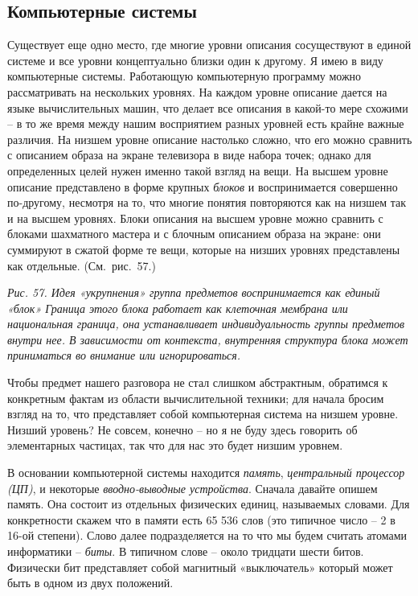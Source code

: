 \documentclass[../main.tex]{subfiles}
\begin{document}
\subsection{Компьютерные системы}

Существует еще одно место, где многие уровни описания сосуществуют в единой системе и все уровни концептуально близки один к другому. Я имею в виду компьютерные системы. Работающую компьютерную программу можно рассматривать на нескольких уровнях. На каждом уровне описание дается на языке вычислительных машин, что делает все описания в какой-то мере схожими \--- в то же время между нашим восприятием разных уровней есть крайне важные различия. На низшем уровне описание настолько сложно, что его можно сравнить с описанием образа на экране телевизора в виде набора точек; однако для определенных целей нужен именно такой взгляд на вещи. На высшем уровне описание представлено в форме крупных \emph{блоков} и воспринимается совершенно по-другому, несмотря на то, что многие понятия повторяются как на низшем так и на высшем уровнях. Блоки описания на высшем уровне можно сравнить с блоками шахматного мастера и с блочным описанием образа на экране: они суммируют в сжатой форме те вещи, которые на низших уровнях представлены как отдельные. (См.~рис.~57.)

\emph{Рис. 57. Идея «укрупнения» группа предметов воспринимается как единый «блок» Граница этого блока работает как клеточная мембрана или национальная граница, она устанавливает индивидуальность группы предметов внутри нее. В зависимости от контекста, внутренняя структура блока может приниматься во внимание или игнорироваться.}

Чтобы предмет нашего разговора не стал слишком абстрактным, обратимся к конкретным фактам из области вычислительной техники; для начала бросим взгляд на то, что представляет собой компьютерная система на низшем уровне. Низший уровень? Не совсем, конечно \--- но я не буду здесь говорить об элементарных частицах, так что для нас это будет низшим уровнем.

В основании компьютерной системы находится \emph{память}, \emph{центральный процессор (ЦП)}, и некоторые \emph{вводно-выводные устройства}. Сначала давайте опишем память. Она состоит из отдельных физических единиц, называемых словами. Для конкретности скажем что в памяти есть 65 536 слов (это типичное число \--- 2 в 16-ой степени). Слово далее подразделяется на то что мы будем считать атомами информатики \--- \emph{биты}. В типичном слове \--- около тридцати шести битов. Физически бит представляет собой магнитный «выключатель» который может быть в одном из двух положений.
\end{document}
